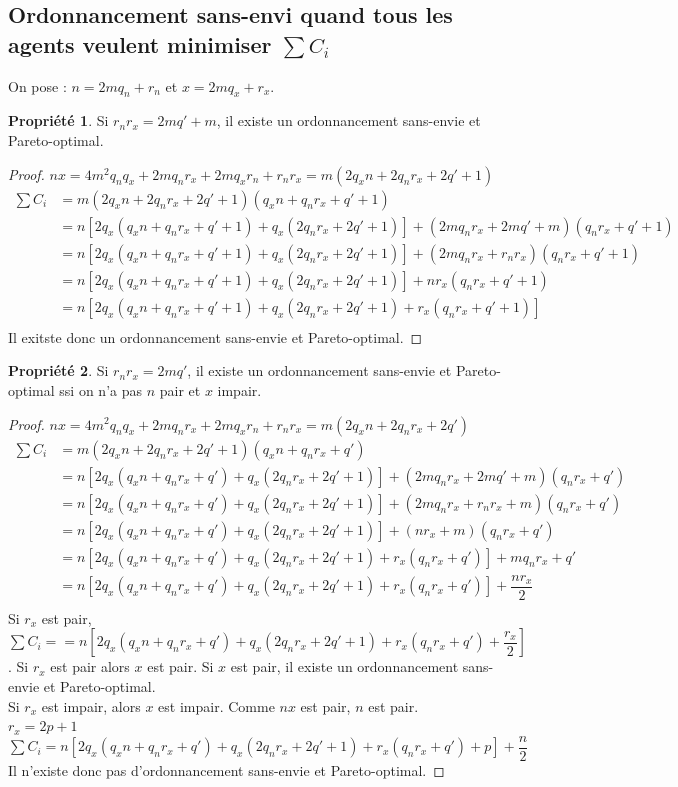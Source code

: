 \documentclass[12pt]{article}
\theoremstyle{definition}
\newtheorem{prop}{Propriété}
\begin{document}
\subsection{Ordonnancement sans-envi quand tous les agents veulent minimiser $\sum C_i$}
\noindent
On pose : $n = 2mq_n+r_n$ et $x = 2mq_x+r_x$.
\begin{prop}
Si $r_nr_x=2mq'+m$, il existe un ordonnancement sans-envie et Pareto-optimal.
\end{prop}
\begin{proof}
$nx = 4m^2q_nq_x+2mq_nr_x+2mq_xr_n+r_nr_x=m(2q_xn+2q_nr_x+2q'+1)$\\
\begin{align*}
\sum C_i &= m(2q_xn+2q_nr_x+2q'+1)(q_xn+q_nr_x+q'+1)\\
&= n[2q_x(q_xn+q_nr_x+q'+1) + q_x(2q_nr_x+2q'+1)] + (2mq_nr_x+2mq'+m)(q_nr_x+q'+1)\\
&=n[2q_x(q_xn+q_nr_x+q'+1) + q_x(2q_nr_x+2q'+1)] + (2mq_nr_x+r_nr_x)(q_nr_x+q'+1)\\
&=n[2q_x(q_xn+q_nr_x+q'+1) + q_x(2q_nr_x+2q'+1)] + nr_x(q_nr_x+q'+1)\\&=n[2q_x(q_xn+q_nr_x+q'+1) + q_x(2q_nr_x+2q'+1) + r_x(q_nr_x+q'+1)]\\
\end{align*}
Il exitste donc un ordonnancement sans-envie et Pareto-optimal.
\end{proof}
\begin{prop}
Si $r_nr_x=2mq'$, il existe un ordonnancement sans-envie et Pareto-optimal ssi on n'a pas $n$ pair et $x$ impair.
\end{prop}
\begin{proof}
$nx = 4m^2q_nq_x+2mq_nr_x+2mq_xr_n+r_nr_x=m(2q_xn+2q_nr_x+2q')$\\
\begin{align*}
\sum C_i &= m(2q_xn+2q_nr_x+2q'+1)(q_xn+q_nr_x+q')\\
&= n[2q_x(q_xn+q_nr_x+q')+q_x(2q_nr_x+2q'+1)] + (2mq_nr_x+2mq'+m)(q_nr_x+q')\\
&= n[2q_x(q_xn+q_nr_x+q')+q_x(2q_nr_x+2q'+1)] + (2mq_nr_x+r_nr_x+m)(q_nr_x+q')\\
&= n[2q_x(q_xn+q_nr_x+q')+q_x(2q_nr_x+2q'+1)] + (nr_x+m)(q_nr_x+q')\\
&= n[2q_x(q_xn+q_nr_x+q')+q_x(2q_nr_x+2q'+1)+r_x(q_nr_x+q')] + mq_nr_x+q'\\
&= n[2q_x(q_xn+q_nr_x+q')+q_x(2q_nr_x+2q'+1)+r_x(q_nr_x+q')] + \dfrac{nr_x}{2}\\
\end{align*}
Si $r_x$ est pair, $\sum C_i = = n[2q_x(q_xn+q_nr_x+q')+q_x(2q_nr_x+2q'+1)+r_x(q_nr_x+q') + \dfrac{r_x}{2}]$.
Si $r_x$ est pair alors $x$ est pair.
Si $x$ est pair, il existe un ordonnancement sans-envie et Pareto-optimal.\\
Si $r_x$ est impair, alors $x$ est impair. Comme $nx$ est pair, $n$ est pair.\\
$r_x = 2p+1$\\
$\sum C_i = n[2q_x(q_xn+q_nr_x+q')+q_x(2q_nr_x+2q'+1)+r_x(q_nr_x+q') +p] + \dfrac{n}{2}$\\
Il n'existe donc pas d'ordonnancement sans-envie et Pareto-optimal.
\end{proof}
\end{document}
